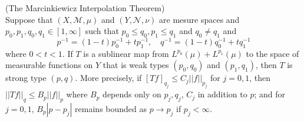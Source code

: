 \documentclass[lang=en, color=blue, ]{elegantbook}
\newcommand{\M}{\mathcal{M}}
\begin{document}
\begin{theorem}
    (The Marcinkiewicz Interpolation Theorem)\\Suppose that $(X,\M,\mu)$ and $(Y,\mathcal{N},\nu)$ are mesure spaces and $p_0,p_1,q_0,q_1 \in [1,\infty]$ such that $p_0 \leq q_0, p_1 \leq q_1$ and $q_0 \neq q_1$ and
    \[
    p^{-1} = (1-t)p_0^{-1} + tp_1^{-1},\quad q^{-1} = (1-t)q_0^{-1}+tq_1^{-1}
    \]
    where $0 < t < 1$. If $T$ is a sublinear map from $L^{p_0}(\mu) + L^{p_1}(\mu)$ to the space of measurable functions on $Y$ that is weak types $(p_0,q_0)$ and $(p_1,q_1)$, then $T$ is strong type $(p,q)$. More precisely, if $[Tf]_{q_j} \leq C_j||f||_{p_j}$ for $j=0,1$, then $||Tf||_q \leq B_p||f||_p$ where $B_p$ depends only on $p_j,q_j$, $C_j$ in addition to $p$; and for $j=0,1$, $B_p|p-p_j|$ remains bounded as $p\to p_j$ if $p_j < \infty$.
\end{theorem}
\end{document}
